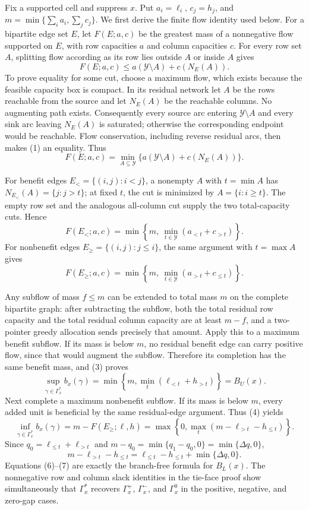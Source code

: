 Fix a supported cell and suppress \(x\).  Put \(a_i=\ell_i\), \(c_j=h_j\), and \(m=\min\{\sum_i a_i,\sum_jc_j\}\).  We first derive the finite flow identity used below.  For a bipartite edge set \(E\), let \(F(E;a,c)\) be the greatest mass of a nonnegative flow supported on \(E\), with row capacities \(a\) and column capacities \(c\).  For every row set \(A\), splitting flow according as its row lies outside \(A\) or inside \(A\) gives
\[
F(E;a,c)\le a(\mathcal Y\setminus A)+c(N_E(A)).
\tag{1}
\]
To prove equality for some cut, choose a maximum flow, which exists because the feasible capacity box is compact.  In its residual network let \(A\) be the rows reachable from the source and let \(N_E(A)\) be the reachable columns.  No augmenting path exists.  Consequently every source arc entering \(\mathcal Y\setminus A\) and every sink arc leaving \(N_E(A)\) is saturated; otherwise the corresponding endpoint would be reachable.  Flow conservation, including reverse residual arcs, then makes (1) an equality.  Thus
\[
F(E;a,c)=\min_{A\subseteq\mathcal Y}\{a(\mathcal Y\setminus A)+c(N_E(A))\}.
\tag{2}
\]

For benefit edges \(E_< =\{(i,j):i<j\}\), a nonempty \(A\) with \(t=\min A\) has \(N_{E_<}(A)=\{j:j>t\}\); at fixed \(t\), the cut is minimized by \(A=\{i:i\ge t\}\).  The empty row set and the analogous all-column cut supply the two total-capacity cuts.  Hence
\[
F(E_<;a,c)=\min\left\{m,\ \min_{t\in\mathcal Y}(a_{<t}+c_{>t})\right\}.
\tag{3}
\]
For nonbenefit edges \(E_{\ge}=\{(i,j):j\le i\}\), the same argument with \(t=\max A\) gives
\[
F(E_{\ge};a,c)=\min\left\{m,\ \min_{t\in\mathcal Y}(a_{>t}+c_{\le t})\right\}.
\tag{4}
\]

Any subflow of mass \(f\le m\) can be extended to total mass \(m\) on the complete bipartite graph: after subtracting the subflow, both the total residual row capacity and the total residual column capacity are at least \(m-f\), and a two-pointer greedy allocation sends precisely that amount.  Apply this to a maximum benefit subflow.  If its mass is below \(m\), no residual benefit edge can carry positive flow, since that would augment the subflow.  Therefore its completion has the same benefit mass, and (3) proves
\[
\sup_{\gamma\in\Gamma_x^{\ast}}b_x(\gamma)
=\min\left\{m,\min_t(\ell_{<t}+h_{>t})\right\}=B_U(x).
\tag{5}
\]
Next complete a maximum nonbenefit subflow.  If its mass is below \(m\), every added unit is beneficial by the same residual-edge argument.  Thus (4) yields
\[
\inf_{\gamma\in\Gamma_x^{\ast}}b_x(\gamma)
=m-F(E_{\ge};\ell,h)
=\max\left\{0,\max_t(m-\ell_{>t}-h_{\le t})\right\}.
\tag{6}
\]
Since \(q_0=\ell_{\le t}+\ell_{>t}\) and \(m-q_0=\min\{q_1-q_0,0\}=\min\{\Delta q,0\}\),
\[
m-\ell_{>t}-h_{\le t}
=\ell_{\le t}-h_{\le t}+\min\{\Delta q,0\}.
\tag{7}
\]
Equations (6)--(7) are exactly the branch-free formula for \(B_L(x)\).  The nonnegative row and column slack identities in the tie-face proof show simultaneously that \(\Gamma_x^{\ast}\) recovers \(\Gamma_x^+\), \(\Gamma_x^-\), and \(\Gamma_x^0\) in the positive, negative, and zero-gap cases.

